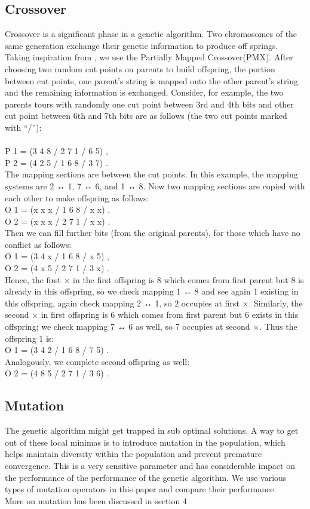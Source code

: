 \documentclass{article}
\begin{document}
\subsection{Crossover}
Crossover is a significant phase in a genetic algorithm. Two chromosomes of the same generation exchange their genetic information to produce off springs. Taking inspiration from \cite{hussain2017genetic}, we use the Partially Mapped Crossover(PMX). After choosing two random cut points on parents
to build offspring, the portion between cut points, one
parent’s string is mapped onto the other parent’s string
and the remaining information is exchanged. Consider, for
example, the two parents tours with randomly one cut point
between 3rd and 4th bits and other cut point between 6th and
7th bits are as follows (the two cut points marked with “/”):
\\\\P 1 = (3 4 8 / 2 7 1 / 6 5) ,
\\P 2 = (4 2 5 / 1 6 8 / 3 7) .
\\The mapping sections are between the cut points. In this
example, the mapping systems are 2 ↔ 1, 7 ↔ 6, and 1 ↔ 8.
Now two mapping sections are copied with each other to
make offspring as follows:
\\O 1 = (x x x / 1 6 8 / x x) ,
\\O 2 = (x x x / 2 7 1 / x x) .
\\Then we can fill further bits (from the original parents),
for those which have no conflict as follows:
\\O 1 = (3 4 x / 1 6 8 / x 5) ,
\\O 2 = (4 x 5 / 2 7 1 / 3 x) .
\\Hence, the first × in the first offspring is 8 which comes
from first parent but 8 is already in this offspring, so we check mapping 1 ↔ 8 and see again 1 existing in this offspring,
again check mapping 2 ↔ 1, so 2 occupies at first ×. Similarly,
the second × in first offspring is 6 which comes from first
parent but 6 exists in this offspring; we check mapping 7 ↔ 6
as well, so 7 occupies at second ×. Thus the offspring 1 is: 
\\O 1 = (3 4 2 / 1 6 8 / 7 5) .
\\Analogously, we complete second offspring as well:
\\O 2 = (4 8 5 / 2 7 1 / 3 6) .

\subsection{Mutation}
The genetic algorithm might get trapped in sub optimal solutions. A way to get out of these local minimas is to introduce mutation in the population, which helps maintain diversity within the population and prevent premature convergence. This is a very sensitive parameter and has considerable impact on the performance of the performance of the genetic algorithm. We use various types of mutation operators in this paper and compare their performance. 
\\More on mutation has been discussed in section 4
\end{document}
